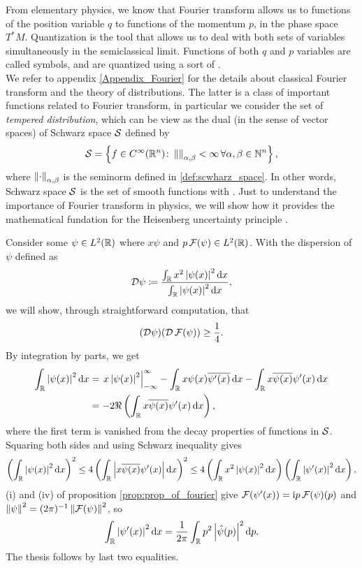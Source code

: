 From elementary physics, we know that Fourier transform allows us to  functions of the position variable $q$ to functions of the momentum $p$, in the phase space $T^{\ast}M$. Quantization is the tool that allows us to deal with both sets of variables simultaneously in the semiclassical limit. Functions of both $q$ and $p$ variables are called symbols, and are quantized using a sort of .\\

We refer to appendix \ref{Appendix_Fourier} for the details about classical Fourier transform and the theory of distributions. The latter is a class of important functions related to Fourier transform, in particular we consider the set of \emph{tempered distribution}, which can be view as the dual (in the sense of vector spaces) of Schwarz space $\mathcal{S}$ defined by 
\[
\mathcal{S}=\left\{
f\in C^{\infty}(\mathbb{R}^{n})\colon \left\lVert \right\rVert_{\alpha,\beta}<\infty
\,\forall\alpha,\beta\in\mathbb{N}^{n}\right\},
\]
where $\left\lVert \cdot\right\rVert_{\alpha,\beta}$ is the seminorm defined in \ref{def:scwharz_space}. In other words, Schwarz space $\mathcal{S}$ is the set of smooth functions with . Just to understand the importance of Fourier transform in physics, we will show how it provides the mathematical fundation for the Heisenberg uncertainty principle \cite{DU:notes}.


\begin{nese}
\label{ese:heisenberg_fourier}
Consider some $\psi\in L^{2}(\mathbb{R})$ where $x\psi$ and $p\operatorname{\mathcal{F}}(\psi)\in L^{2}(\mathbb{R})$. With the dispersion of $\psi$ defined as
\[
\mathcal{D}\psi\coloneqq\frac{\int_{\mathbb{R}}x^{2}\left| \psi(x)\right|^{2}\mathop{}\!\mathrm{d} x}{\int_{\mathbb{R}}\left| \psi(x)\right|^{2}\mathop{}\!\mathrm{d} x},
\]
we will show, through straightforward computation, that 
\[
(\mathcal{D}\psi)(\mathcal{D}\operatorname{\mathcal{F}}(\psi))\geq\frac{1}{4}.
\]
By integration by parts, we get
\begin{align*}
\int_{\mathbb{R}}\left| \psi(x)\right|^{2}\mathop{}\!\mathrm{d} x &= \left.x\left| \psi(x)\right|^{2}\right|_{-\infty}^{\infty}-\int_{\mathbb{R}}x\psi(x)\overline{\psi'(x)}\mathop{}\!\mathrm{d} x-\int_{\mathbb{R}}x\overline{\psi(x)}\psi'(x)\mathop{}\!\mathrm{d} x\\
&=-2\Re\left(
\int_{\mathbb{R}}x\overline{\psi(x)}\psi'(x)\mathop{}\!\mathrm{d} x
\right),
\end{align*}
where the first term is vanished from the decay properties of functions in $\mathcal{S}$. Squaring both sides and using Schwarz inequality gives 
\[
\left( 
\int_{\mathbb{R}}\left| \psi(x)\right|^{2}\mathop{}\!\mathrm{d} x
\right)^{2}\leq 4
\left(\int_{\mathbb{R}}\left| x\overline{\psi(x)}\psi'(x)\right|\mathop{}\!\mathrm{d} x\right)^{2}\leq 4\left(\int_{\mathbb{R}}x^{2}\left| \psi(x)\right|^{2}\mathop{}\!\mathrm{d} x\right)\left(
\int_{\mathbb{R}}\left| \psi'(x)\right|^{2}\mathop{}\!\mathrm{d} x
\right).
\]
(i) and (iv) of proposition \ref{prop:prop_of_fourier} give $\operatorname{\mathcal{F}}(\psi'(x))=\mathrm{i} p\operatorname{\mathcal{F}}(\psi)(p)$ and $\left\lVert \psi\right\rVert^{2}=(2\pi)^{-1}\left\lVert \operatorname{\mathcal{F}}(\psi)\right\rVert^{2}$, so
\[
\int_{\mathbb{R}}\left| \psi'(x)\right|^{2}\mathop{}\!\mathrm{d} x = \frac{1}{2\pi}\int_{\mathbb{R}}p^{2}\left| \hat{\psi}(p)\right|^{2}\mathop{}\!\mathrm{d} p.
\]
The thesis follows by last two equalities.
\end{nese}


